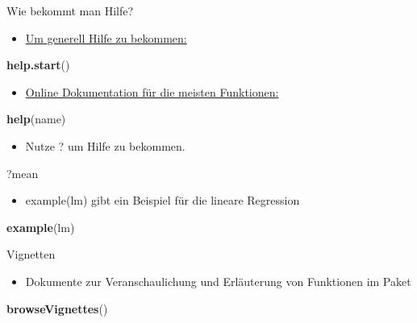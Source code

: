 \documentclass[ignorenonframetext,]{beamer}
\newenvironment{Shaded}{}{}
\newcommand{\KeywordTok}[1]{\textcolor[rgb]{0.00,0.44,0.13}{\textbf{{#1}}}}
\newcommand{\NormalTok}[1]{{#1}}
\providecommand{\tightlist}{%
\setlength{\itemsep}{0pt}\setlength{\parskip}{0pt}}
\begin{document}
\begin{frame}[fragile]{Wie bekommt man Hilfe?}

\begin{itemize}
\tightlist
\item
  \href{http://itfeature.com/tag/how-to-get-help-in-r}{Um generell Hilfe
  zu bekommen:}
\end{itemize}

\begin{Shaded}
\begin{Highlighting}[]
\KeywordTok{help.start}\NormalTok{()}
\end{Highlighting}
\end{Shaded}

\begin{itemize}
\tightlist
\item
  \href{https://www.r-project.org/help.html}{Online Dokumentation für
  die meisten Funktionen:}
\end{itemize}

\begin{Shaded}
\begin{Highlighting}[]
\KeywordTok{help}\NormalTok{(name)}
\end{Highlighting}
\end{Shaded}

\begin{itemize}
\tightlist
\item
  Nutze ? um Hilfe zu bekommen.
\end{itemize}

\begin{Shaded}
\begin{Highlighting}[]
\NormalTok{?mean}
\end{Highlighting}
\end{Shaded}

\begin{itemize}
\tightlist
\item
  example(lm) gibt ein Beispiel für die lineare Regression
\end{itemize}

\begin{Shaded}
\begin{Highlighting}[]
\KeywordTok{example}\NormalTok{(lm)}
\end{Highlighting}
\end{Shaded}

\end{frame}

\begin{frame}[fragile]{Vignetten}

\begin{itemize}
\tightlist
\item
  Dokumente zur Veranschaulichung und Erläuterung von Funktionen im
  Paket
\end{itemize}

\begin{Shaded}
\begin{Highlighting}[]
\KeywordTok{browseVignettes}\NormalTok{()}
\end{Highlighting}
\end{Shaded}

\end{frame}
\end{document}
